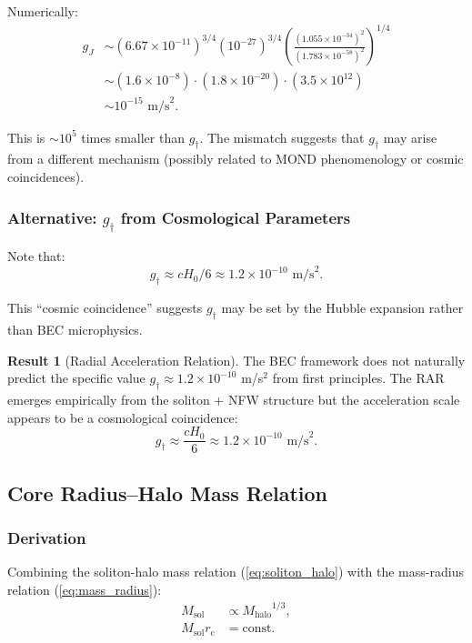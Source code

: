 \documentclass[11pt,a4paper]{article}
\newcommand{\ee}[1]{\times 10^{#1}}
\newcommand{\Msol}{\ensuremath{M_{\mathrm{sol}}}}
\newcommand{\Mhalo}{\ensuremath{M_{\mathrm{halo}}}}
\newcommand{\rc}{\ensuremath{r_{\mathrm{c}}}}
\newcommand{\gdagger}{\ensuremath{g_{\dagger}}}
\theoremstyle{definition}
\newtheorem{result}{Result}
\theoremstyle{remark}
\begin{document}
Numerically:
\begin{align}
g_J &\sim (6.67\ee{-11})^{3/4} (10^{-27})^{3/4} \left(\frac{(1.055\ee{-34})^2}{(1.783\ee{-58})^2}\right)^{1/4} \\
&\sim (1.6\ee{-8}) \cdot (1.8\ee{-20}) \cdot (3.5\ee{12}) \\
&\sim 10^{-15} \text{ m/s}^2.
\end{align}

This is $\sim 10^5$ times smaller than $\gdagger$. The mismatch suggests that $\gdagger$ may arise from a different mechanism (possibly related to MOND phenomenology or cosmic coincidences).

\subsubsection{Alternative: $\gdagger$ from Cosmological Parameters}

Note that:
\begin{equation}
\gdagger \approx c H_0 / 6 \approx 1.2 \times 10^{-10} \text{ m/s}^2.
\end{equation}

This ``cosmic coincidence'' suggests $\gdagger$ may be set by the Hubble expansion rather than BEC microphysics.

\begin{result}[Radial Acceleration Relation]
The BEC framework does not naturally predict the specific value $\gdagger \approx 1.2 \times 10^{-10}$ m/s$^2$ from first principles. The RAR emerges empirically from the soliton + NFW structure but the acceleration scale appears to be a cosmological coincidence:
\begin{equation}
\boxed{\gdagger \approx \frac{c H_0}{6} \approx 1.2 \times 10^{-10} \text{ m/s}^2.}
\end{equation}
\end{result}

\subsection{Core Radius--Halo Mass Relation}
\label{sec:rc_Mhalo}

\subsubsection{Derivation}

Combining the soliton-halo mass relation (\ref{eq:soliton_halo}) with the mass-radius relation (\ref{eq:mass_radius}):
\begin{align}
\Msol &\propto \Mhalo^{1/3}, \\
\Msol \rc &= \text{const}.
\end{align}
\end{document}
